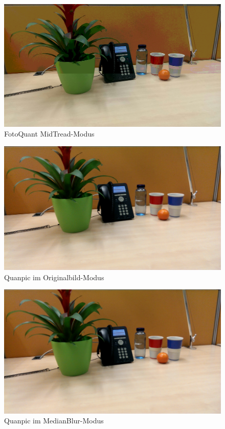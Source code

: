 \begin{landscape}
\begin{figure}[h]
	\centering
		\includegraphics[width=1.4\textwidth]{img/Fotos/FotoQuant_Midtread.jpg}
	\caption[FotoQuant MidTread]{FotoQuant MidTread-Modus}
	\label{fig:quant_mid}
\end{figure}

\begin{figure}[h]
	\centering
		\includegraphics[width=1.4\textwidth]{img/Fotos/QuanPic_Original.png}
	\caption[QuanPic Original]{Quanpic im Originalbild-Modus}
	\label{fig:quan_orig}
\end{figure}

\begin{figure}[h]
	\centering
		\includegraphics[width=1.4\textwidth]{img/Fotos/QuanPic_Medianblur.png}
	\caption[QuanPic MedianBlur]{Quanpic im MedianBlur-Modus}
	\label{fig:quan_med}
\end{figure}


\end{landscape}
